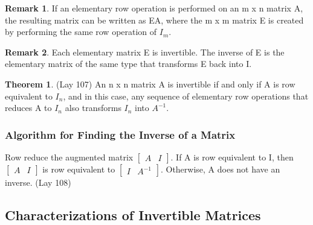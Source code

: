 \documentclass[12pt]{article}
\theoremstyle{definition}
\newtheorem{theorem}{Theorem}  %
\newtheorem*{remark}{Remark}        %
\numberwithin{equation}{theorem}    %
\newcommand{\drawvec}[1]{                    %
    \begin{bmatrix}
        #1
    \end{bmatrix}
}
\begin{document}
\begin{remark}
    If an elementary row operation is performed on an m x n matrix A, the resulting matrix can be written as EA, where the m x m matrix E is created by performing the same row operation of $I_m$.
\end{remark}

\begin{remark}
    Each elementary matrix E is invertible. The inverse of E is the elementary matrix of the same type that transforms E back into I.
\end{remark}

\begin{theorem}(Lay 107)
    An n x n matrix A is invertible if and only if A is row equivalent to $I_n$, and in this case, any sequence of elementary row operations that reduces A to $I_n$ also transforms $I_n$ into $A^{-1}$.
\end{theorem}

\subsubsection{Algorithm for Finding the Inverse of a Matrix}

Row reduce the augmented matrix $\drawvec{A & I}$.  If A is row equivalent to I, then $\drawvec{A & I}$ is row equivalent to $\drawvec{I & A^{-1}}$. Otherwise, A does not have an inverse. (Lay 108)

\subsection{Characterizations of Invertible Matrices}
\end{document}
